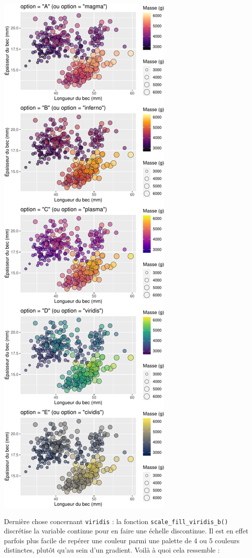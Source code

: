 \documentclass[
  a4paper,
  DIV=11,
  numbers=noendperiod,
  oneside]{scrreprt}
\begin{document}
\includegraphics{03-visualization_files/figure-pdf/unnamed-chunk-93-1.pdf}

Dernière chose concernant \texttt{viridis} : la fonction
\texttt{scale\_fill\_viridis\_b()} discrétise la variable continue pour
en faire une échelle discontinue. Il est en effet parfois plus facile de
repérer une couleur parmi une palette de 4 ou 5 couleurs distinctes,
plutôt qu'au sein d'un gradient. Voilà à quoi cela ressemble :
\end{document}
